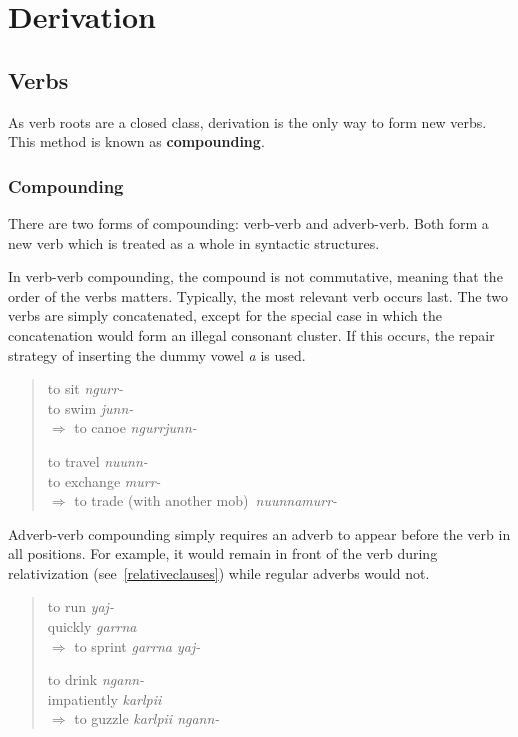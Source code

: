 \chapter{Derivation}

\section{Verbs}

As verb roots are a closed class, derivation is the only way to form new verbs.
This method is known as \textbf{compounding}.

\subsection{Compounding}

There are two forms of compounding: verb-verb and adverb-verb. Both form a new
verb which is treated as a whole in syntactic structures.

In verb-verb compounding, the compound is not commutative, meaning that the
order of the verbs matters. Typically, the most relevant verb occurs last. The
two verbs are simply concatenated, except for the special case in which the
concatenation would form an illegal consonant cluster. If this occurs, the
repair strategy of inserting the dummy vowel \textit{a} is used.

\begin{quote}
\begin{multicols}{2}
to sit \textit{ngurr-}\\
to swim \textit{junn-}\\
$\Rightarrow$ to canoe \textit{ngurrjunn-}

to travel \textit{nuunn-}\\
to exchange \textit{murr-}\\
$\Rightarrow$ to trade (with another mob)~\textit{nuunnamurr-}
\end{multicols}
\end{quote}

Adverb-verb compounding simply requires an adverb to appear before the verb in
all positions. For example, it would remain in front of the verb during
relativization (see~\ref{relativeclauses}) while regular adverbs would not.

\begin{quote}
\begin{multicols}{2}
to run \textit{yaj-}\\
quickly \textit{garrna}\\
$\Rightarrow$ to sprint \textit{garrna yaj-}

to drink \textit{ngann-}\\
impatiently \textit{karlpii}\\
$\Rightarrow$ to guzzle \textit{karlpii ngann-}
\end{multicols}
\end{quote}

